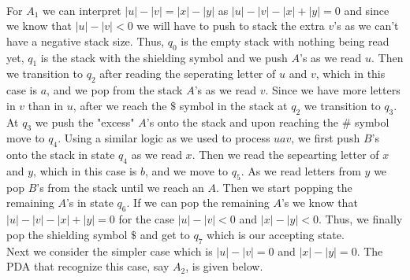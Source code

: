 \documentclass [10pt]{article}
\begin{document}
\begin{enumerate}
\begin{enumerate}
\\
		For $A_{1}$ we can interpret $\left|u\right|-\left|v\right| = \left|x\right|-\left|y\right|$ as $\left|u\right|-\left|v\right| - \left|x\right|+\left|y\right| = 0$ and since we know that $\left|u\right|-\left|v\right| < 0$ we will have to push to stack the extra $v$'s as we can't have a negative stack size. Thus, $q_{0}$ is the empty stack with nothing being read yet, $q_{1}$ is the stack with the shielding symbol and we push $A$'s as we read $u$. Then we transition to $q_{2}$ after reading the seperating letter of $u$ and $v$, which in this case is $a$, and we pop from the stack $A$'s as we read $v$. Since we have more letters in $v$ than in $u$, after we reach the $\$$ symbol in the stack at $q_{2}$ we transition to $q_{3}$. At $q_{3}$ we push the "excess" $A$'s onto the stack and upon reaching the $\#$ symbol move to $q_{4}$. Using a similar logic as we used to process $uav$, we first push $B$'s onto the stack in state $q_{4}$ as we read $x$. Then we read the sepearting letter of $x$ and $y$, which in this case is $b$, and we move to $q_{5}$. As we read letters from $y$ we pop $B$'s from the stack until we reach an $A$. Then we start popping the remaining $A$'s in state $q_{6}$. If we can pop the remaining $A$'s we know that $\left|u\right|-\left|v\right| - \left|x\right|+\left|y\right| = 0$ for the case $\left|u\right|-\left|v\right| < 0$ and $\left|x\right|-\left|y\right| < 0$. Thus, we finally pop the shielding symbol $\$$ and get to $q_{7}$ which is our accepting state.\\
		Next we consider the simpler case which is $\left|u\right|-\left|v\right| = 0$ and $\left|x\right|-\left|y\right| = 0$. The PDA that recognize this case, say $A_{2}$, is given below.\\
		\begin{tikzpicture}[baseline=(q_0.north),>=stealth',shorten >=1pt, auto,node distance=1.5cm,align=center]

\end{tikzpicture}
\end{enumerate}
\end{enumerate}
\end{document}
